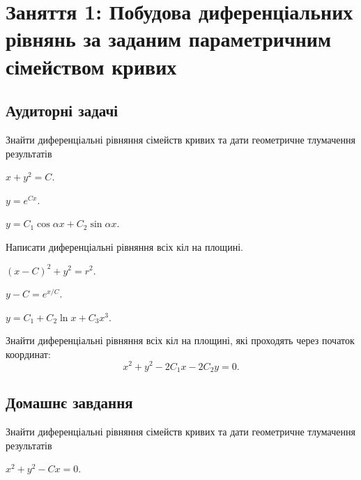 \section*{Заняття 1: Побудова диференціальних рівнянь за заданим параметричним сімейством кривих}

\subsection*{Аудиторні задачі}

Знайти диференціальні рівняння сімейств кривих та дати геометричне тлумачення результатів

\begin{problem}
	$x + y^2 =C$.
\end{problem}

\begin{problem}
	$y = e^{C x}$.
\end{problem}

\begin{problem}
	$y = C_1 \cos \alpha x + C_2 \sin \alpha x$.
\end{problem}

\begin{problem}
	Написати диференціальні рівняння всіх кіл на площині.
\end{problem}

\begin{problem}
	$(x - C)^2 + y^2 = r^2$.
\end{problem}

\begin{problem}
	$y - C = e^{x / C}$.
\end{problem}

\begin{problem}
	$y = C_1 + C_2 \ln x + C_3 x^3$.
\end{problem}

\begin{problem}
	Знайти диференціальні рівняння всіх кіл на площині, які проходять через початок координат:
	\[x^2 + y^2 - 2 C_1 x - 2 C_2 y = 0.\]
\end{problem}

\subsection*{Домашнє завдання}

Знайти диференціальні рівняння сімейств кривих та дати геометричне тлумачення результатів

\begin{problem}
	$x^2 + y^2 - C x = 0$.
\end{problem}

